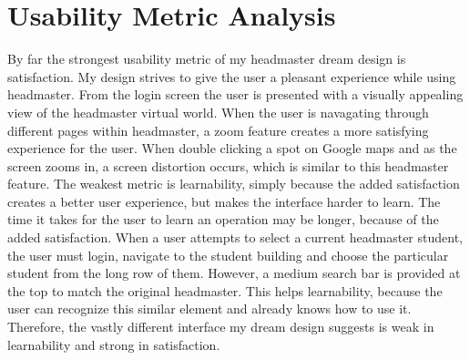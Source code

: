 \documentclass[11pt]{article}
\begin{document}
\section{Usability Metric Analysis}
By far the strongest usability metric of my headmaster dream design is satisfaction. My design strives to give the user a pleasant experience while using headmaster. From the login screen the user is presented with a visually appealing view of the headmaster virtual world. When the user is navagating through different pages within headmaster, a zoom feature creates a more satisfying experience for the user. When double clicking a spot on Google maps and as the screen zooms in, a screen distortion occurs, which is similar to this headmaster feature.
The weakest metric is learnability, simply because the added satisfaction creates a better user experience, but makes the interface harder to learn. The time it takes for the user to learn an operation may be longer, because of the added satisfaction. When a user attempts to select a current headmaster student, the user must login, navigate to the student building and choose the particular student from the long row of them. However, a medium search bar is provided at the top to match the original headmaster. This helps learnability, because the user can recognize this similar element and already knows how to use it. Therefore, the vastly different interface my dream design suggests is weak in learnability and strong in satisfaction.
\end{document}
